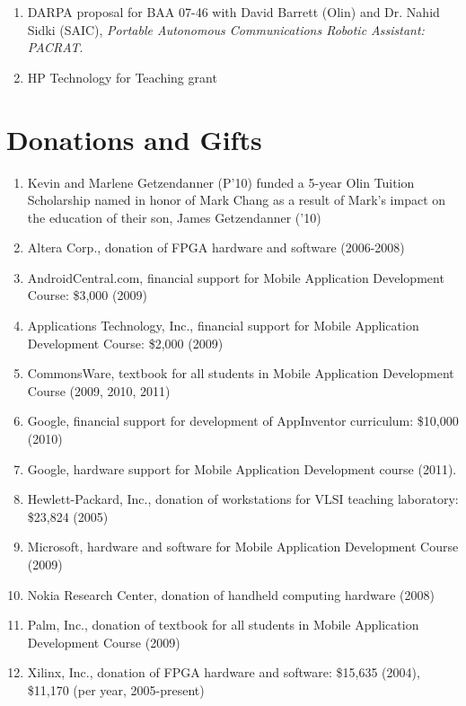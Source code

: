 \documentclass[line]{res}
\begin{document}
\begin{resume}
\begin{enumerate}
		\item DARPA proposal for BAA 07-46 with David Barrett (Olin) and Dr. Nahid Sidki (SAIC), \textit{Portable Autonomous Communications Robotic Assistant: PACRAT}. 

		\item HP Technology for Teaching grant 
	\end{enumerate}
	
	\section{\sc Donations and Gifts}
	\begin{enumerate}
		
		\item Kevin and Marlene Getzendanner (P'10) funded a 5-year Olin Tuition Scholarship named in honor of Mark Chang as a result of Mark’s impact on the education of their son, James Getzendanner ('10) 
		\item Altera Corp., donation of FPGA hardware and software (2006-2008) 
		\item AndroidCentral.com, financial support for Mobile Application Development Course: \$3,000 (2009) 
		\item Applications Technology, Inc., financial support for Mobile Application Development Course: \$2,000 (2009) 
		\item CommonsWare, textbook for all students in Mobile Application Development Course (2009, 2010, 2011) 
		\item Google, financial support for development of AppInventor curriculum: \$10,000 (2010)
		\item Google, hardware support for Mobile Application Development course (2011).
		\item Hewlett-Packard, Inc., donation of workstations for VLSI teaching laboratory: \$23,824 (2005) 
		\item Microsoft, hardware and software for Mobile Application Development Course (2009) 
		\item Nokia Research Center, donation of handheld computing hardware (2008) 
		\item Palm, Inc., donation of textbook for all students in Mobile Application Development Course (2009) 
		\item Xilinx, Inc., donation of FPGA hardware and software: \$15,635 (2004), \$11,170 (per year, 2005-present)
	\end{enumerate}
	

\end{resume}
\end{document}
